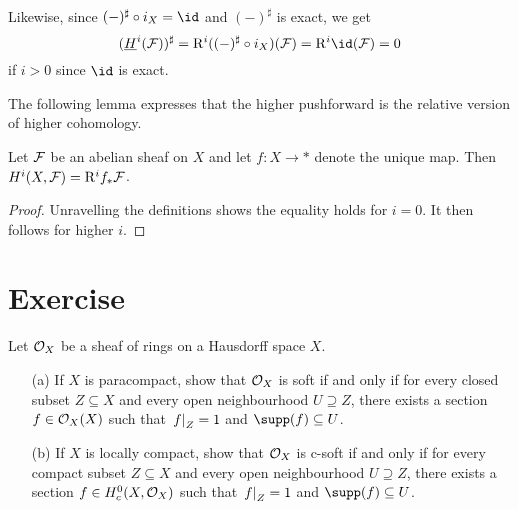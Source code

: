 \documentclass[../main.tex]{subfiles}
\begin{document}
Likewise, since $(-)^\sharp \circ i_X = \id$ and $(-)^\sharp$ is exact, we get
\[(\underline{H}^i(\sh F))^\sharp = \rightderived^i((-)^\sharp \circ i_X)(\sh F) = \rightderived^i \id(\sh F) = 0\]
if $i>0$ since $\id$ is exact.

The following lemma expresses that the higher pushforward is the relative version of higher cohomology.

\begin{lem}\label{exc:cohomology-higher-pushforward-to-point}
Let \(\mathcal{F}\) be an abelian sheaf on \(X\) and let \(f\colon X\to *\) denote the unique map.
Then \(\cohomology^i(X,\sh F) = \rightderived^i f_*\sh F\).
\end{lem}
\begin{proof}
Unravelling the definitions shows the equality holds for \(i=0\).
It then follows for higher \(i\).
\end{proof}

\section*{Exercise}

\begin{exe} Let $\mathcal{O}_X$ be a sheaf of rings on a Hausdorff space $X$.
\begin{enumerate}
    \item[(a)] If $X$ is paracompact, show that $\mathcal{O}_X$ is soft if and only if for every closed subset $Z\subseteq X$ and every open neighbourhood $U\supseteq Z$, there exists a section $f\in \mathcal{O}_X(X)$ such that $\left.f\right|_{Z} = 1$ and $\supp(f)\subseteq U$. 
    \item[(b)] If $X$ is locally compact, show that $\mathcal{O}_X$ is c-soft if and only if for every compact subset $Z\subseteq X$ and every open neighbourhood $U\supseteq Z$, there exists a section $f\in H^0_c(X, \mathcal{O}_X)$ such that $\left.f\right|_{Z} = 1$ and $\supp(f) \subseteq U$. 
\end{enumerate}
\end{exe}
\end{document}
